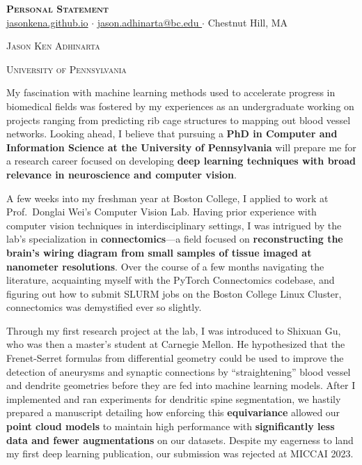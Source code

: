 \documentclass[letterpaper,11pt]{article}
\newcommand{\dualsectionold}[2]{%
  \noindent
    \parbox[b]{0.5\textwidth}{\raggedright\scshape\large #1}%
    \hfill
    \parbox[b]{0.5\textwidth}{\raggedleft\scshape\large #2}%
}
\newcommand{\dualsectionhline}{%
  \vspace{2pt}\color{black}\titlerule\vspace{-5pt}
}
\newcommand{\dualsection}[2]{%
  \dualsectionold{#1}{#2}%
  \vspace{-5pt}\dualsectionhline
}
\begin{document}
\justifying

\begin{center}
  \textbf{\Huge \scshape Personal Statement} \\ \vspace{3pt}
    \small
    \href{https://jasonkena.github.io}{jasonkena.github.io}
   \hspace{0.05cm}$\cdot$\hspace{0.05cm}
    \href{mailto:jason.adhinarta@bc.edu}{ jason.adhinarta@bc.edu }
   \hspace{0.05cm}$\cdot$\hspace{0.05cm}
    Chestnut Hill, MA
\end{center}


\dualsection{Jason Ken Adhinarta}{University of Pennsylvania}
\vspace{2pt}\color{black}\titlerule%

My fascination with machine learning methods used to accelerate progress in biomedical fields was fostered by my experiences as an undergraduate working on projects ranging from predicting rib cage structures to mapping out blood vessel networks. Looking ahead, I believe that pursuing a \textbf{PhD in Computer and Information Science at the University of Pennsylvania} will prepare me for a research career focused on developing \textbf{deep learning techniques with broad relevance in neuroscience and computer vision}.

A few weeks into my freshman year at Boston College, I applied to work at Prof.\ Donglai Wei’s Computer Vision Lab. Having prior experience with computer vision techniques in interdisciplinary settings, I was intrigued by the lab’s specialization in \textbf{connectomics}---a field focused on \textbf{reconstructing the brain’s wiring diagram from small samples of tissue imaged at nanometer resolutions}. Over the course of a few months navigating the literature, acquainting myself with the PyTorch Connectomics codebase, and figuring out how to submit SLURM jobs on the Boston College Linux Cluster, connectomics was demystified ever so slightly.

Through my first research project at the lab, I was introduced to Shixuan Gu, who was then a master’s student at Carnegie Mellon. He hypothesized that the Frenet-Serret formulas from differential geometry could be used to improve the detection of aneurysms and synaptic connections by “straightening” blood vessel and dendrite geometries before they are fed into machine learning models. After I implemented and ran experiments for dendritic spine segmentation, we hastily prepared a manuscript detailing how enforcing this \textbf{equivariance} allowed our \textbf{point cloud models} to maintain high performance with \textbf{significantly less data and fewer augmentations} on our datasets. Despite my eagerness to land my first deep learning publication, our submission was rejected at MICCAI 2023.
\end{document}
